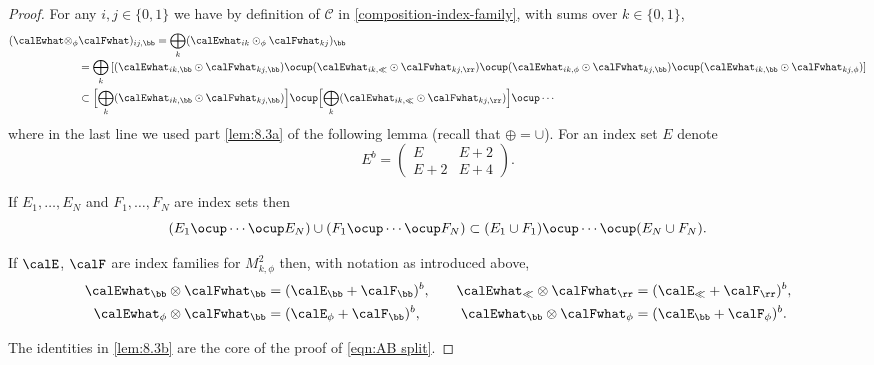 \begin{proof}
For any $i,j\in\{0,1\}$ we have by definition of $\mathscr{C}$ in
\eqref{composition-index-family}, with sums over $k\in\{0,1\}$,
\begin{align}
(\calEwhat \otimes_\phi& \calFwhat)_{ij,\bb}
= \bigoplus_{k} (\calEwhat_{ik} \odot_\phi \calFwhat_{kj})_\bb
\notag\\[-3pt]
& = \bigoplus_k \left[ (\calEwhat_{ik,\bb} \odot \calFwhat_{kj,\bb}) \ocup (\calEwhat_{ik,\ll} \odot \calFwhat_{kj,\rr}) \ocup (\calEwhat_{ik,\phi} \odot \calFwhat_{kj,\bb}) \ocup
(\calEwhat_{ik,\bb} \odot \calFwhat_{kj,\phi})
\right]\label{eqn:E tensor F calc}
\\
& \subset \Bigl[ \bigoplus_k (\calEwhat_{ik,\bb} \odot \calFwhat_{kj,\bb}) \Bigr] \ocup
\Bigl[ \bigoplus_k (\calEwhat_{ik,\ll} \odot \calFwhat_{kj,\rr}) \Bigr] \ocup \cdots \notag
\end{align}
where in the last line we used part \eqref{lem:8.3a} of the following lemma (recall that $\oplus=\cup$). For an index set $E$ denote\vspace*{-3pt}
\[
E^b =
\begin{pmatrix}
E & E+2\\
E+2 & E+4
\end{pmatrix}.
\]

\skpt
\begin{Lemma}\label{lem:8.3}
\begin{enumeratea}
\item\label{lem:8.3a}
If $E_1,\dots,E_N$ and $F_1,\dots,F_N$ are index sets then
\[
(E_1\ocup\cdots\ocup E_N) \cup (F_1 \ocup\cdots\ocup F_N)
\subset (E_1\cup F_1) \ocup \cdots \ocup (E_N \cup F_N).
\]
\item\label{lem:8.3b}
If $\calE$, $\calF$ are index families for $M^2_{k,\phi}$ then, with notation as introduced above,
\begin{align*}
\calEwhat_\bb\otimes \calFwhat_\bb &= (\calE_\bb+\calF_\bb)^b,\quad
&\calEwhat_\ll\otimes \calFwhat_\rr &= (\calE_\ll+\calF_\rr)^b, \\
\calEwhat_\phi\otimes \calFwhat_\bb &= (\calE_\phi+\calF_\bb)^b,\quad
& \calEwhat_\bb\otimes \calFwhat_\phi &= (\calE_\bb+\calF_\phi)^b.
\end{align*}
\end{enumeratea}
\end{Lemma}
The identities in \eqref{lem:8.3b} are the core of the proof of \eqref{eqn:AB split}.


\end{proof}
